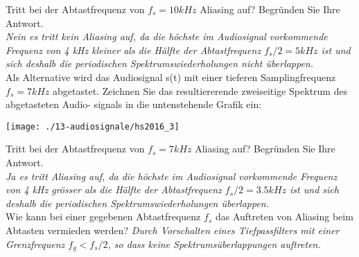 Tritt bei der Abtastfrequenz von $f_s = 10 kHz$ Aliasing auf? Begründen Sie Ihre Antwort.\\
\textit{Nein es tritt kein Aliasing auf, da die höchste im Audiosignal vorkommende Frequenz von 4 kHz kleiner als die Hälfte der Abtastfrequenz $f_s/2 = 5 kHz$ ist und sich deshalb die periodischen Spektrumswiederholungen nicht überlappen.}\\

Als Alternative wird das Audiosignal s(t) mit einer tieferen Samplingfrequenz $f_s = 7 kHz$ abgetastet. Zeichnen Sie das resultiererende zweiseitige Spektrum des abgetasteten Audio-
signals in die untenstehende Grafik ein:
\begin{center}
    \vspace{-8pt}
    \texttt{[image: ./13-audiosignale/hs2016\_3]}
    \vspace{-8pt}
\end{center}

Tritt bei der Abtastfrequenz von $f_s = 7 kHz$ Aliasing auf? Begründen Sie Ihre Antwort.\\
\textit{Ja es tritt Aliasing auf, da die höchste im Audiosignal vorkommende Frequenz von 4 kHz grösser als die Hälfte der Abtastfrequenz $f_s/2 = 3.5 kHz$ ist und sich deshalb die
periodischen Spektrumswiederholungen überlappen.}\\

Wie kann bei einer gegebenen Abtastfrequenz $f_s$ das Auftreten von Aliasing beim Abtasten vermieden werden?
\textit{Durch Vorschalten eines Tiefpassfilters mit einer Grenzfrequenz $f_g < f_s/2$, so dass keine Spektrumsüberlappungen auftreten.}